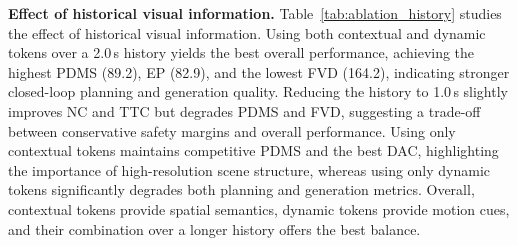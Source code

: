\documentclass[runningheads]{llncs}
\begin{document}
\begin{center}
\end{center}

\noindent\textbf{Effect of historical visual information.}
Table~\ref{tab:ablation_history} studies the effect of historical visual information. 
Using both contextual and dynamic tokens over a 2.0\,s history yields the best overall performance, achieving the highest PDMS (89.2), EP (82.9), and the lowest FVD (164.2), indicating stronger closed-loop planning and generation quality. 
Reducing the history to 1.0\,s slightly improves NC and TTC but degrades PDMS and FVD, suggesting a trade-off between conservative safety margins and overall performance. 
Using only contextual tokens maintains competitive PDMS and the best DAC, highlighting the importance of high-resolution scene structure, whereas using only dynamic tokens significantly degrades both planning and generation metrics. 
Overall, contextual tokens provide spatial semantics, dynamic tokens provide motion cues, and their combination over a longer history offers the best balance.
\end{document}
